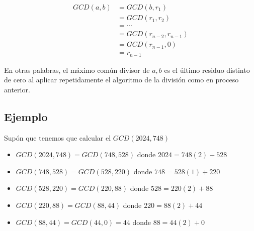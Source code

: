 \documentclass[12pt]{report}                                    %
\begin{document}
\begin{itemize}
                    \begin{equation*}
                    \begin{split}
                        GCD(a,b)    &= GCD(b,r_1)           \\
                                    &= GCD(r_1,r_2)         \\
                                    &= \cdots               \\
                                    &= GCD(r_{n-2},r_{n-1}) \\
                                    &= GCD(r_{n-1}, 0)      \\
                                    &= r_{n-1} 
                    \end{split}
                    \end{equation*}

            \end{itemize}

            En otras palabras, el máximo común divisor de $a,b$ es el último residuo distinto
            de cero al aplicar repetidamente el algoritmo de la división como en proceso anterior.



        \clearpage
        \subsection{Ejemplo}
            Supón que tenemos que calcular el $GCD(2024, 748)$


            \begin{itemize}
                \item $GCD(2024, 748) = GCD(748, 528)$   donde $2024=748(2)+528$

                \item $GCD(748, 528)  = GCD(528, 220)$   donde $748=528(1)+220$

                \item $GCD(528, 220)  = GCD(220, 88)$    donde $528=220(2)+88$

                \item $GCD(220, 88)   = GCD(88, 44)$     donde $220=88(2)+44$

                \item $GCD(88, 44)    = GCD(44, 0) = 44$ donde $88=44(2)+0$
            \end{itemize}
\end{document}

